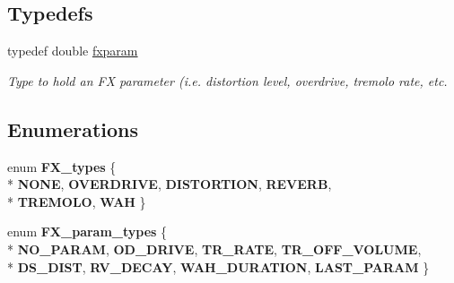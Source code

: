 \subsection*{Typedefs}
\begin{DoxyCompactItemize}
\item 
\hypertarget{group___f_x_ga206aa2d2b25bdca17a838a03412b11f7}{typedef double \hyperlink{group___f_x_ga206aa2d2b25bdca17a838a03412b11f7}{fxparam}}\label{group___f_x_ga206aa2d2b25bdca17a838a03412b11f7}

\begin{DoxyCompactList}\small\item\em Type to hold an F\+X parameter (i.\+e. distortion level, overdrive, tremolo rate, etc. \end{DoxyCompactList}\end{DoxyCompactItemize}
\subsection*{Enumerations}
\begin{DoxyCompactItemize}
\item 
\hypertarget{group___f_x_ga6ee5a38b8497791c4b173dcea4116086}{enum {\bfseries F\+X\+\_\+types} \{ \\*
{\bfseries N\+O\+N\+E}, 
{\bfseries O\+V\+E\+R\+D\+R\+I\+V\+E}, 
{\bfseries D\+I\+S\+T\+O\+R\+T\+I\+O\+N}, 
{\bfseries R\+E\+V\+E\+R\+B}, 
\\*
{\bfseries T\+R\+E\+M\+O\+L\+O}, 
{\bfseries W\+A\+H}
 \}}\label{group___f_x_ga6ee5a38b8497791c4b173dcea4116086}

\item 
\hypertarget{group___f_x_ga7071d6115e95b5800a26c1ef3c03ffae}{enum {\bfseries F\+X\+\_\+param\+\_\+types} \{ \\*
{\bfseries N\+O\+\_\+\+P\+A\+R\+A\+M}, 
{\bfseries O\+D\+\_\+\+D\+R\+I\+V\+E}, 
{\bfseries T\+R\+\_\+\+R\+A\+T\+E}, 
{\bfseries T\+R\+\_\+\+O\+F\+F\+\_\+\+V\+O\+L\+U\+M\+E}, 
\\*
{\bfseries D\+S\+\_\+\+D\+I\+S\+T}, 
{\bfseries R\+V\+\_\+\+D\+E\+C\+A\+Y}, 
{\bfseries W\+A\+H\+\_\+\+D\+U\+R\+A\+T\+I\+O\+N}, 
{\bfseries L\+A\+S\+T\+\_\+\+P\+A\+R\+A\+M}
 \}}\label{group___f_x_ga7071d6115e95b5800a26c1ef3c03ffae}

\end{DoxyCompactItemize}
